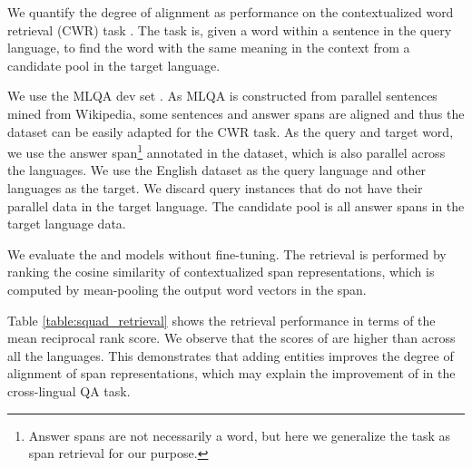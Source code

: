 \documentclass[11pt]{article}
\newcommand{\minisection}[1]{\noindent{\bf {#1}.}}
\begin{document}
\minisection{Task}
We quantify the degree of alignment as performance on the contextualized word retrieval (CWR) task \citep{Cao2020MultilingualAO}. The task is, given a word within a sentence in the query language, to find the word with the same meaning in the context from a candidate pool in the target language.

\minisection{Dataset}
We use the MLQA dev set \citep{lewis-etal-2020-mlqa}.
As MLQA is constructed from parallel sentences mined from Wikipedia, some sentences and answer spans are aligned and thus the dataset can be easily adapted for the CWR task.
As the query and target word, we use the answer span\footnote{Answer spans are not necessarily a word, but here we generalize the task as span retrieval for our purpose.} annotated in the dataset, which is also parallel across the languages.
We use the English dataset as the query language and other languages as the target.
We discard query instances that do not have their parallel data in the target language.
The candidate pool is all answer spans in the target language data.

\minisection{Models}
We evaluate the \mlukeW{}\ba{} and \mlukeE{}\ba{} models without fine-tuning.
The retrieval is performed by ranking the cosine similarity of contextualized span representations, which is computed by mean-pooling the output word vectors in the span.

\minisection{Results}
Table \ref{table:squad_retrieval} shows the retrieval performance in terms of the mean reciprocal rank score.
We observe that the scores of \mlukeE{}\ba{} are higher than \mlukeW{}\ba{} across all the languages.
This demonstrates that adding entities improves the degree of alignment of span representations, which may explain the improvement of \mlukeE{} in the cross-lingual QA task.
\end{document}
